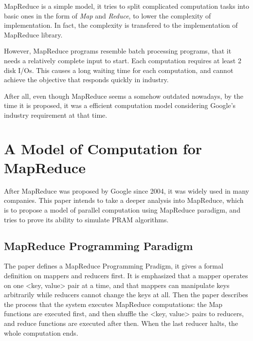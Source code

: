 \documentclass[]{report}
\begin{document}
		MapReduce is a simple model, it tries to split complicated computation tasks into basic ones in the form of \textit{Map} and \textit{Reduce}, to lower the complexity of implementation. In fact, the complexity is transfered to the implementation of MapReduce library.
		
		However, MapReduce programs resemble batch processing programs, that it needs a relatively complete input to start. Each computation requires at least 2 disk I/Os. This causes a long waiting time for each computation, and cannot achieve the objective that responds quickly in industry.
		
		After all, even though MapReduce seems a somehow outdated nowadays, by the time it is proposed, it was a efficient computation model considering Google's industry requirement at that time.


\newpage
\section*{A Model of Computation for MapReduce}
	After MapReduce was proposed by Google since 2004, it was widely used in many companies. This paper intends to take a deeper analysis into MapReduce, which is to propose a model of parallel computation using MapReduce paradigm, and tries to prove its ability to simulate PRAM algorithms.
	
	\subsection*{MapReduce Programming Paradigm}
		The paper defines a MapReduce Programming Pradigm, it gives a formal definition on mappers and reducers first. It is emphasized that a mapper operates on one <key, value> pair at a time, and that mappers can manipulate keys arbitrarily while reducers cannot change the keys at all. Then the paper describes the process that the system executes MapReduce computations: the Map functions are executed first, and then shuffle the <key, value> pairs to reducers, and reduce functions are executed after then. When the last reducer halts, the whole computation ends. 
		
\end{document}
